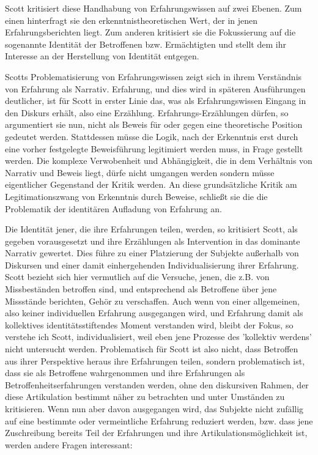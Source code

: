 Scott kritisiert diese Handhabung von Erfahrungswissen auf zwei Ebenen. Zum
einen hinterfragt sie den erkenntnistheoretischen Wert, der in jenen
Erfahrungsberichten liegt. Zum anderen kritisiert sie die Fokussierung auf die
sogenannte Identität der Betroffenen bzw. Ermächtigten und stellt dem ihr
Interesse an der Herstellung von Identität entgegen.

Scotts Problematisierung
von Erfahrungswissen zeigt sich in ihrem Verständnis von Erfahrung als
Narrativ. Erfahrung, und dies wird in späteren Ausführungen deutlicher, ist für
Scott in erster Linie das, was als Erfahrungswissen Eingang in den Diskurs
erhält, also eine Erzählung. Erfahrungs-Erzählungen dürfen, so argumentiert sie
nun, nicht als Beweis für oder gegen eine theoretische Position gedeutet
werden. Stattdessen müsse die Logik, nach der Erkenntnis erst durch eine vorher
festgelegte Beweisführung legitimiert werden muss, in Frage gestellt werden.
Die komplexe Verwobenheit und Abhängigkeit, die in dem Verhältnis von Narrativ
und Beweis liegt, dürfe nicht umgangen werden sondern müsse eigentlicher
Gegenstand der Kritik werden. An diese grundsätzliche Kritik am
Legitimationszwang von Erkenntnis durch Beweise, schließt sie die die
Problematik der identitären Aufladung von Erfahrung an.


Die Identität jener, die ihre Erfahrungen teilen, werden, so kritisiert Scott,
als gegeben vorausgesetzt und ihre Erzählungen als Intervention in das
dominante Narrativ gewertet. Dies führe zu einer Platzierung der Subjekte
außerhalb von Diskursen und einer damit einhergehenden Individualisierung ihrer
Erfahrung. Scott bezieht sich hier vermutlich auf die Versuche, jenen, die z.B.
von Missbeständen betroffen sind, und entsprechend als Betroffene über jene
Missstände berichten, Gehör zu verschaffen. Auch wenn von einer allgemeinen,
also keiner individuellen Erfahrung ausgegangen wird, und Erfahrung damit als
kollektives identitätsstiftendes Moment verstanden wird, bleibt der Fokus, so
verstehe ich Scott, individualisiert, weil eben jene Prozesse des 'kollektiv
werdens' nicht untersucht werden. Problematisch für Scott ist also nicht, dass
Betroffen aus ihrer Perspektive heraus ihre Erfahrungen teilen, sondern
problematisch ist, dass sie als Betroffene wahrgenommen und ihre Erfahrungen
als Betroffenheitserfahrungen verstanden werden, ohne den diskursiven Rahmen,
der diese Artikulation bestimmt näher zu betrachten und unter Umständen zu
kritisieren. Wenn nun aber davon ausgegangen wird, das Subjekte nicht zufällig
auf eine bestimmte oder vermeintliche Erfahrung reduziert werden, bzw. dass
jene Zuschreibung bereits Teil der Erfahrungen und ihre
Artikulationsmöglichkeit ist, werden andere Fragen interessant: 

